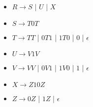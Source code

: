\documentclass[12pt,a4paper,oneside]{article}
\begin{document}
\begin{enumerate}
\begin{enumerate}
{			\begin{itemize}
				\item[] $R \rightarrow S$ | $U$ | $X$
				\item[] $S \rightarrow T0T$
				\item[] $T \rightarrow  TT$ | $0T1$ | $1T0$ | $0$ | $\epsilon$
				\item[] $U \rightarrow V1V$
				\item[] $V \rightarrow  VV$ | $0V1$ | $1V0$ | $1$ | $\epsilon$
				\item[] $X \rightarrow Z10Z$
				\item[] $Z \rightarrow 0Z$ | $1Z$ | $\epsilon$
			\end{itemize}
		}
	\end{enumerate}

\end{enumerate}
\end{document}
